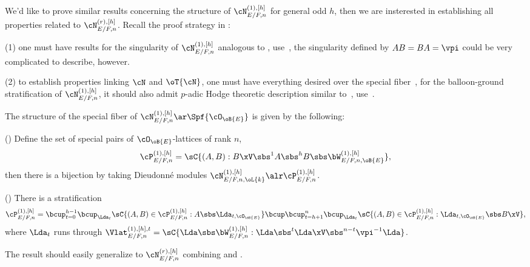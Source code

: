 \documentclass[a4paper, twoside]{article}
\begin{document}
\begin{rmk}
	We'd like to prove similar results concerning the structure of $\cN_{E/F,n}^{(1),[h]}$ for general odd $h$, then we are insterested in establishing all properties related to $\cN_{E/F,n}^{(r),[h]}$. Recall the proof strategy in \cite{LRZ2024Quasi}:

	(1) one must have results for the singularity of $\cN_{E/F,n}^{(1),[h]}$ analogous to \cite[Proposition~14.2.4]{LRZ2024Quasi}, use~\cite[4.4.5]{Gortz2001}, the singularity defined by $AB=BA=\vpi$ could be very complicated to describe, however.

	(2) to establish properties linking $\cN$ and $\oT{\cN}$, one must have everything desired over the special fiber~\cite[Lemma~14.7.1]{LRZ2024Quasi}, for the balloon-ground stratification of $\cN_{E/F,n}^{(1),[h]}$, it should also admit $p$-adic Hodge theoretic description similar to~\cite[15.3]{LRZ2024Quasi}, use~\cite[Chapter~2,3]{Cho2019}.

\end{rmk}


\begin{thm}
	The structure of the special fiber of $\cN_{E/F,n}^{(1),[h]}\ar\Spf{\cO_{\oB{E}}}$ is given by the following:
	\begin{itm}
		\item (\cite[Proposition~2.4]{Cho2019}) Define the set of special pairs of $\cO_{\oB{E}}$-lattices of rank $n$,
		\[
			\cP_{E/F,n}^{(1),[h]}=\sC{(A,B):B\xV\sbs^{1}A\sbs^{h}B\sbs\bW_{E/F,n,\oB{E}}^{(1),[h]}},
		\]
		then there is a bijection by taking Dieudonn{\'e} modules $\cN_{E/F,n,\oL{k}}^{(1),[h]}\alr \cP_{E/F,n}^{(1),[h]}$.
		\item (\cite[Proposition~2.10, Proposition~2.11, Proposition~2.12]{Cho2019}) There is a stratification
		\[
			\cP_{E/F,n}^{(1),[h]}=\bcup_{t=0}^{h-1}\bcup_{\Lda_{t}}\sC{(A,B)\in\cP_{E/F,n}^{(1),[h]}:A\sbs\Lda_{t,\cO_{\oB{E}}}}\bcup\bcup_{t=h+1}^{n}\bcup_{\Lda_{t}}\sC{(A,B)\in\cP_{E/F,n}^{(1),[h]}:\Lda_{t,\cO_{\oB{E}}}\sbs B\xV},
		\]
		where $\Lda_{t}$ runs through $\Vlat_{E/F,n}^{(1),[h],t}=\sC{\Lda\sbs\bW_{E/F,n}^{(1),[h]}:\Lda\sbs^{t}\Lda\xV\sbs^{n-t}\vpi^{-1}\Lda}$.
	\end{itm}
\end{thm}

\begin{rmk}
	The result should easily generalize to $\cN_{E/F,n}^{(r),[h]}$ combining \cite[Lemma~1.5]{Vollaard2010} and \cite[Lemma~2.7]{Cho2019}.
\end{rmk}


\printref
\end{document}
